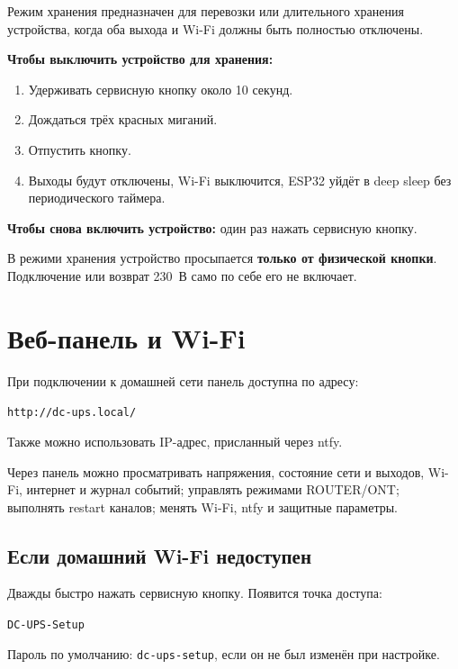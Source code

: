 \documentclass[10.5pt,a5paper]{article}
\begin{document}
Режим хранения предназначен для перевозки или длительного хранения устройства, когда оба выхода и Wi-Fi должны быть полностью отключены.

\textbf{Чтобы выключить устройство для хранения:}
\begin{enumerate}
  \item Удерживать сервисную кнопку около 10 секунд.
  \item Дождаться трёх красных миганий.
  \item Отпустить кнопку.
  \item Выходы будут отключены, Wi-Fi выключится, ESP32 уйдёт в deep sleep без периодического таймера.
\end{enumerate}

\textbf{Чтобы снова включить устройство:} один раз нажать сервисную кнопку.

\begin{warnbox}[title=Важно]
В режими хранения устройство просыпается \textbf{только от физической кнопки}. Подключение или возврат 230~В само по себе его не включает.
\end{warnbox}

\section{Веб-панель и Wi-Fi}

При подключении к домашней сети панель доступна по адресу:
\begin{center}
\large\texttt{http://dc-ups.local/}
\end{center}

Также можно использовать IP-адрес, присланный через ntfy.

Через панель можно просматривать напряжения, состояние сети и выходов, Wi-Fi, интернет и журнал событий; управлять режимами ROUTER/ONT; выполнять restart каналов; менять Wi-Fi, ntfy и защитные параметры.

\subsection{Если домашний Wi-Fi недоступен}
Дважды быстро нажать сервисную кнопку. Появится точка доступа:

\begin{center}
\texttt{DC-UPS-Setup}
\end{center}

Пароль по умолчанию: \texttt{dc-ups-setup}, если он не был изменён при настройке.
\end{document}
